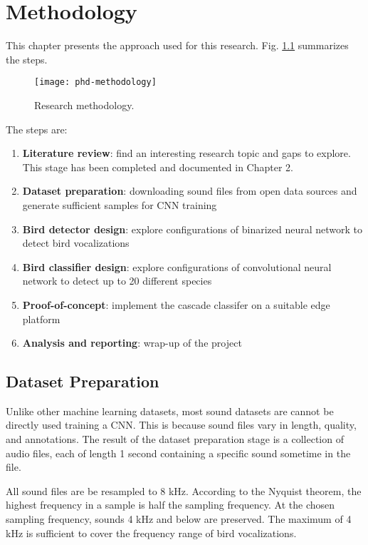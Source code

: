 
\chapter{Methodology}

This chapter presents the approach used for this research.
 Fig. \ref{phd-methodology} summarizes the steps.

\begin{figure}[h]
\centering
\texttt{[image: phd-methodology]}
\caption{Research methodology.}
\label{phd-methodology}
\end{figure}

The steps are:
\begin{enumerate}
    \item \textbf{Literature review}: find an interesting research topic and gaps to explore. This stage has been completed and documented in Chapter 2.
    \item \textbf{Dataset preparation}: downloading sound files from open data sources and generate sufficient samples for CNN training
    \item \textbf{Bird detector design}: explore configurations of binarized neural network to detect bird vocalizations
    \item \textbf{Bird classifier design}: explore configurations of convolutional neural network to detect up to 20 different species
    \item \textbf{Proof-of-concept}: implement the cascade classifer on a suitable edge platform
    \item \textbf{Analysis and reporting}: wrap-up of the project
\end{enumerate}

\section{Dataset Preparation}

Unlike other machine learning datasets, most sound datasets are cannot be directly used training a CNN. This is because sound files vary in length, quality, and annotations.
The result of the dataset preparation stage is a collection of audio files, each of length 1 second containing a specific sound sometime in the file.

All sound files are be resampled to 8 kHz. According to the Nyquist theorem, the highest frequency in a sample is half the sampling frequency. At the chosen sampling frequency, sounds 4 kHz and below are preserved. The maximum of 4 kHz is sufficient to cover the frequency range of bird vocalizations.

